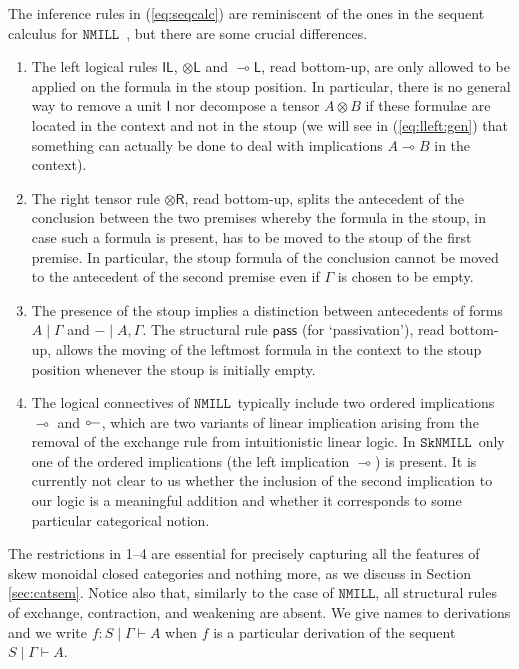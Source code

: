 \documentclass[copyright,creativecommons]{eptcs}
\theoremstyle{definition}
\newcommand{\tl}{\otimes \mathsf{L}}
\newcommand{\tr}{\otimes \mathsf{R}}
\newcommand{\lleft}{{\multimap}\mathsf{L}}
\newcommand{\pass}{\mathsf{pass}}
\newcommand{\unitl}{\mathsf{IL}}
\newcommand{\ot}{\otimes}
\newcommand{\lolli}{\multimap}
\newcommand{\illol}{\rotatebox[origin=c]{180}{$\multimap$}}
\newcommand{\I}{\mathsf{I}}
\newcommand{\NMILL}{$\mathtt{NMILL}$}
\newcommand{\SkNMILL}{$\mathtt{SkNMILL}$}
\begin{document}
The inference rules in (\ref{eq:seqcalc}) are reminiscent of the ones in the sequent calculus for \NMILL\ \cite{abrusci:noncommutative:1990}, but there are some crucial differences.
\begin{enumerate}
\item The left logical rules $\unitl$, $\tl$ and $\lleft$, read bottom-up, are only allowed to be applied on the formula in the stoup position. In particular, there is no general way to remove a unit $\I$ nor decompose a tensor $A \ot B$ if these formulae are located in the context and not in the stoup (we will see in (\ref{eq:lleft:gen}) that something can actually be done to deal with implications $A \lolli B$ in the context).
\item The right tensor rule $\tr$, read bottom-up, splits the antecedent of the conclusion between the two premises whereby the formula in the stoup, in case such a formula is present, has to be moved to the stoup of the first premise. In particular, the stoup formula of the conclusion cannot be moved to the antecedent of the second premise even if $\Gamma$ is chosen to be empty.
\item The presence of the stoup implies a distinction between antecedents of forms $A \mid \Gamma$ and ${-} \mid A, \Gamma$. The structural rule $\pass$ (for `passivation'), read bottom-up, allows the moving of the leftmost formula in the context to the stoup position whenever the stoup is initially empty.
\item The logical connectives of \NMILL\ typically include two ordered implications $\lolli$ and $\illol$, which are two variants of linear implication arising from the removal of the exchange rule from intuitionistic linear logic. In \SkNMILL\ only one of the ordered implications (the left implication $\lolli$) is present. It is currently not clear to us whether the inclusion of the second implication to our logic is a meaningful addition and whether it corresponds to some particular categorical notion.
\end{enumerate}
The restrictions in 1--4 are essential for precisely capturing all the features of skew monoidal closed categories and nothing more, as we discuss in Section \ref{sec:catsem}.
Notice also that, similarly to the case of \NMILL, all structural rules of exchange, contraction, and weakening are absent. We give names to derivations and we write $f : S \mid \Gamma \vdash A$ when $f$ is a particular derivation of the sequent $S \mid \Gamma \vdash A$.
\end{document}
